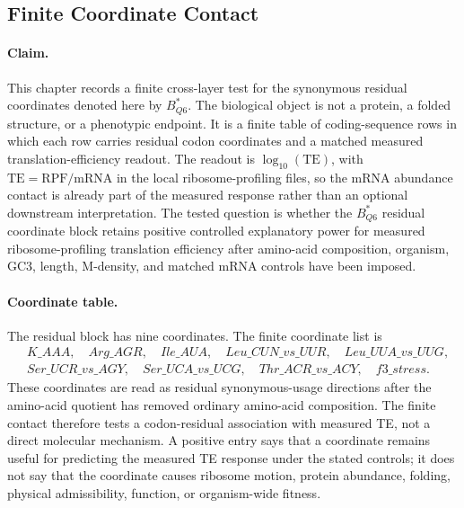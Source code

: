 \subsection{Finite Coordinate Contact}\label{sec:q6-ribosome-te-survival-coordinate-contact}

\paragraph{Claim.}
This chapter records a finite cross-layer test for the synonymous residual coordinates denoted here by $B^*_{Q6}$.  The biological object is not a protein, a folded structure, or a phenotypic endpoint.  It is a finite table of coding-sequence rows in which each row carries residual codon coordinates and a matched measured translation-efficiency readout.  The readout is $\log_{10}(\mathrm{TE})$, with $\mathrm{TE}=\mathrm{RPF}/\mathrm{mRNA}$ in the local ribosome-profiling files, so the mRNA abundance contact is already part of the measured response rather than an optional downstream interpretation.  The tested question is whether the $B^*_{Q6}$ residual coordinate block retains positive controlled explanatory power for measured ribosome-profiling translation efficiency after amino-acid composition, organism, GC3, length, M-density, and matched mRNA controls have been imposed.

\paragraph{Coordinate table.}
The residual block has nine coordinates.  The finite coordinate list is
$$
\begin{aligned}
&K\_AAA,\quad Arg\_AGR,\quad Ile\_AUA,\quad Leu\_CUN\_vs\_UUR,\quad Leu\_UUA\_vs\_UUG,\\
&Ser\_UCR\_vs\_AGY,\quad Ser\_UCA\_vs\_UCG,\quad Thr\_ACR\_vs\_ACY,\quad f3\_stress.
\end{aligned}
$$
These coordinates are read as residual synonymous-usage directions after the amino-acid quotient has removed ordinary amino-acid composition.  The finite contact therefore tests a codon-residual association with measured TE, not a direct molecular mechanism.  A positive entry says that a coordinate remains useful for predicting the measured TE response under the stated controls; it does not say that the coordinate causes ribosome motion, protein abundance, folding, physical admissibility, function, or organism-wide fitness.
